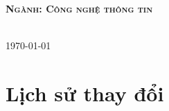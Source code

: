 \documentclass[12pt]{article}
\begin{document}
\begin{titlepage}
		\textsc{\Large \bfseries Ngành: Công nghệ thông tin}
		
		\hfill\\[4cm]
		
		{\large \today}\\[3cm] %
		
		
		
		\vfill %
		
	\end{titlepage}
	
	
	\tableofcontents
	\newpage
	\section*{Lịch sử thay đổi}
\end{document}
